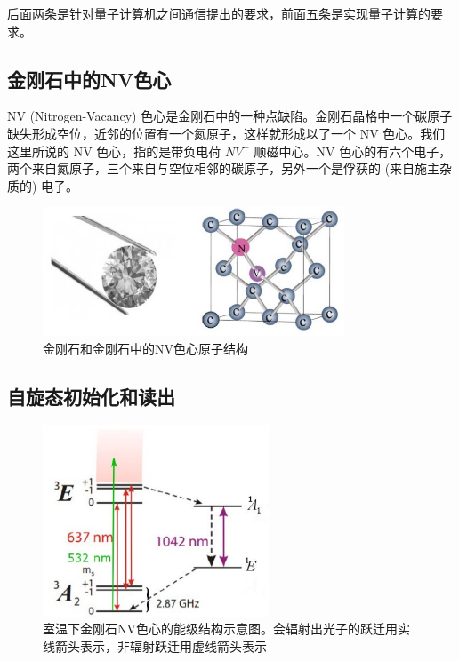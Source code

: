 \documentclass[a4paper,UTF8]{ctexart}
\begin{document}
后面两条是针对量子计算机之间通信提出的要求，前面五条是实现量子计算的要求。

\subsection{金刚石中的NV色心}

NV (Nitrogen-Vacancy) 色心是金刚石中的一种点缺陷。金刚石晶格中一个碳原子缺失形成空位，近邻的位置有一个氮原子，这样就形成以了一个 NV 色心。我们这里所说的 NV 色心，指的是带负电荷 $NV^-$ 顺磁中心。NV 色心的有六个电子， 两个来自氮原子，三个来自与空位相邻的碳原子，另外一个是俘获的 (来自施主杂质的) 电子。

\begin{figure}[H]
    \centering
    \begin{minipage}[b]{0.9\textwidth}
        \centering
        \includegraphics[width=0.8\textwidth]{./fig4.jpg}
        \caption{金刚石和金刚石中的NV色心原子结构}
    \end{minipage}
\end{figure}




\subsection{自旋态初始化和读出}

\begin{figure}[H]
    \centering
    \begin{minipage}[b]{0.9\textwidth}
        \centering
        \includegraphics[width=0.6\textwidth]{./fig5.jpg}
        \caption{室温下金刚石NV色心的能级结构示意图。会辐射出光子的跃迁用实线箭头表示，非辐射跃迁用虚线箭头表示}
    \end{minipage}
\end{figure}
\end{document}
